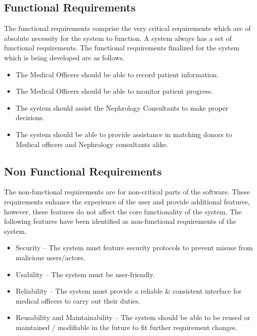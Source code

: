 \documentclass[12pt,a4paper]{report}
\begin{document}
\subsection{Functional Requirements}
The functional requirements comprise the very critical requirements which are of absolute necessity for the system to function. A system always has a set of functional requirements. The functional requirements finalized for the system which is being developed are as follows.
\begin{itemize}
\item The Medical Officers should be able to record patient information.
\item The Medical Officers should be able to monitor patient progress.
\item The system should assist the Nephrology Consultants to make proper decisions.
\item The system should be able to provide assistance in matching donors to Medical officers and Nephrology consultants alike.
\end{itemize}






\subsection{Non Functional Requirements}

The non-functional requirements are for non-critical parts of the software. These requirements enhance the experience of the user and provide additional features, however, these features do not affect the core functionality of the system. The following features have been identified as non-functional requirements of the system. 

\begin{itemize}
\item Security – The system must feature security protocols to prevent misuse from malicious users/actors.
\item Usability – The system must be user-friendly. 
\item Reliability – The system must provide a reliable \& consistent interface for medical officers to carry out their duties.
\item Reusability and Maintainability – The system should be able to be reused or maintained / modifiable in the future to fit further requirement changes. 
\end{itemize}
\end{document}
